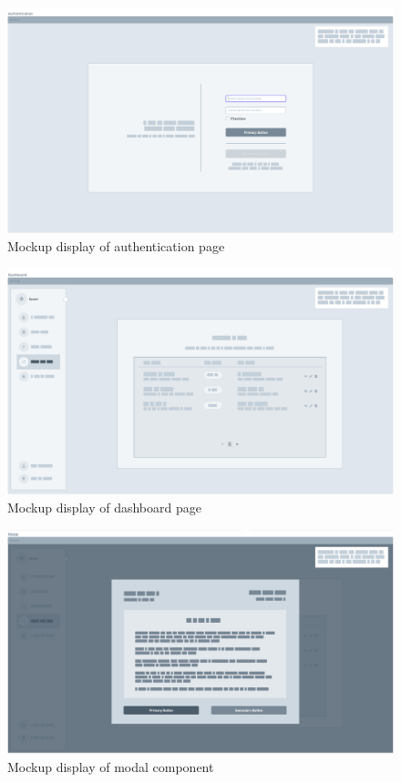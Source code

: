 \documentclass[../Main.tex]{subfiles}
\begin{document}
\begin{figure}[H]
    \centering
    \includegraphics[scale=0.3]{doc/imgs/mockup1.png}
    \caption{Mockup display of authentication page}
    \label{fig:Mockup1}
\end{figure}
\begin{figure}[H]
    \centering
    \includegraphics[scale=0.3]{doc/imgs/mockup2.png}
    \caption{Mockup display of dashboard page}
    \label{fig:Mockup2}
\end{figure}
\begin{figure}[H]
    \centering
    \includegraphics[scale=0.3]{doc/imgs/mockup3.png}
    \caption{Mockup display of modal component}
    \label{fig:Mockup3}
\end{figure}
\end{document}
